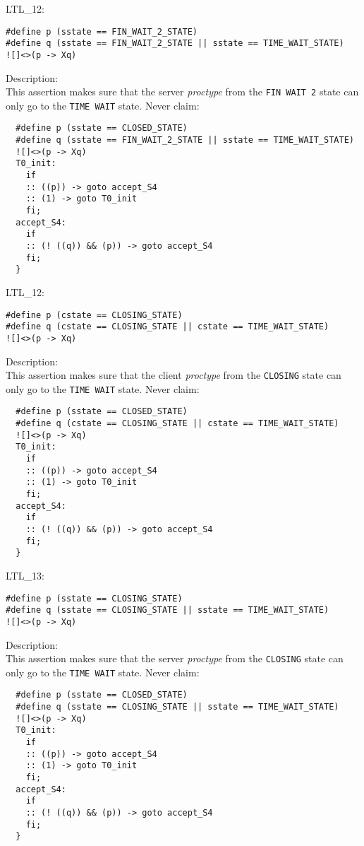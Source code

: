 \documentclass{WigReport}
\begin{document}
LTL\_12:\\
\begin{lstlisting}
#define p (sstate == FIN_WAIT_2_STATE)
#define q (sstate == FIN_WAIT_2_STATE || sstate == TIME_WAIT_STATE)
![]<>(p -> Xq)
\end{lstlisting}
Description:\\
This assertion makes sure that the server \textit{proctype} from the \verb|FIN WAIT 2| state can only go to the \verb|TIME WAIT| state.
Never claim:\\
\begin{lstlisting}
  #define p (sstate == CLOSED_STATE)
  #define q (sstate == FIN_WAIT_2_STATE || sstate == TIME_WAIT_STATE)
  ![]<>(p -> Xq)
  T0_init:
    if
    :: ((p)) -> goto accept_S4
    :: (1) -> goto T0_init
    fi;
  accept_S4:
    if
    :: (! ((q)) && (p)) -> goto accept_S4
    fi;
  }
\end{lstlisting}


LTL\_12:\\
\begin{lstlisting}
#define p (cstate == CLOSING_STATE)
#define q (cstate == CLOSING_STATE || cstate == TIME_WAIT_STATE)
![]<>(p -> Xq)
\end{lstlisting}
Description:\\
This assertion makes sure that the client \textit{proctype} from the \verb|CLOSING| state can only go to the \verb|TIME WAIT| state.
Never claim:\\
\begin{lstlisting}
  #define p (sstate == CLOSED_STATE)
  #define q (cstate == CLOSING_STATE || cstate == TIME_WAIT_STATE)
  ![]<>(p -> Xq)
  T0_init:
    if
    :: ((p)) -> goto accept_S4
    :: (1) -> goto T0_init
    fi;
  accept_S4:
    if
    :: (! ((q)) && (p)) -> goto accept_S4
    fi;
  }
\end{lstlisting}


LTL\_13:\\
\begin{lstlisting}
#define p (sstate == CLOSING_STATE)
#define q (sstate == CLOSING_STATE || sstate == TIME_WAIT_STATE)
![]<>(p -> Xq)
\end{lstlisting}
Description:\\
This assertion makes sure that the server \textit{proctype} from the \verb|CLOSING| state can only go to the \verb|TIME WAIT| state.
Never claim:\\
\begin{lstlisting}
  #define p (sstate == CLOSED_STATE)
  #define q (sstate == CLOSING_STATE || sstate == TIME_WAIT_STATE)
  ![]<>(p -> Xq)
  T0_init:
    if
    :: ((p)) -> goto accept_S4
    :: (1) -> goto T0_init
    fi;
  accept_S4:
    if
    :: (! ((q)) && (p)) -> goto accept_S4
    fi;
  }
\end{lstlisting}
\end{document}
